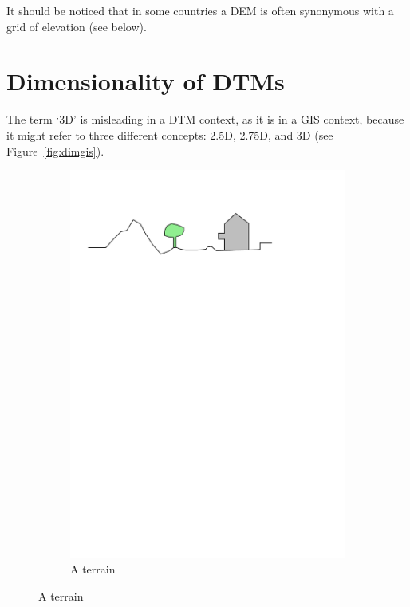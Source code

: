It should be noticed that in some countries a DEM is often synonymous with a grid of elevation (see below).


%
\section{Dimensionality of DTMs}

The term `3D' is misleading in a DTM context, as it is in a GIS context, because it might refer to three different concepts: 2.5D, 2.75D, and 3D (see Figure~\ref{fig:dimgis}).
\begin{figure}
  \centering
  \begin{subfigure}[b]{0.45\linewidth}
    \centering
    \includegraphics[page=1,width=\linewidth]{figs/dimgis}
    \caption{A terrain}\label{fig:dimgis:1}
  \end{subfigure}%
  \qquad %

\end{figure}
